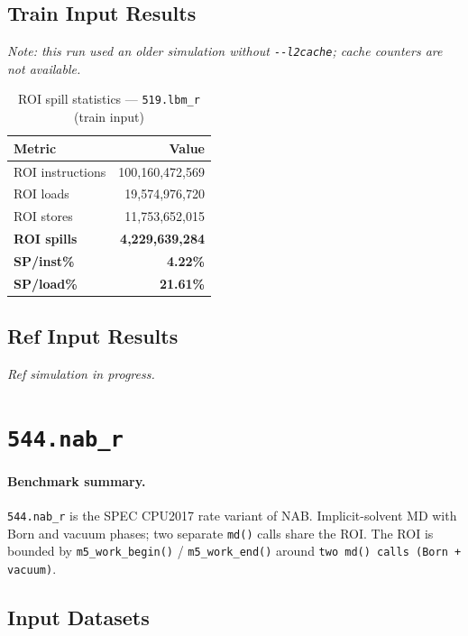 \documentclass[11pt,a4paper]{article}
\begin{document}
\subsection{Train Input Results}

\textit{Note: this run used an older simulation without \texttt{-{}-l2cache}; cache counters are not available.}


\begin{table}[H]
\centering
\caption{ROI spill statistics --- \texttt{519.lbm\_r} (train input)}
\label{tab:lbm_train_roi}
\begin{tabular}{lr}
\toprule
\textbf{Metric} & \textbf{Value} \\
\midrule
ROI instructions & 100,160,472,569 \\
ROI loads        & 19,574,976,720 \\
ROI stores       & 11,753,652,015 \\
\textbf{ROI spills}   & \textbf{4,229,639,284} \\
\textbf{SP/inst\%}   & \textbf{4.22\%} \\
\textbf{SP/load\%}   & \textbf{21.61\%} \\
\bottomrule
\end{tabular}
\end{table}

\subsection{Ref Input Results}
\textit{Ref simulation in progress.}



\section{\texttt{544.nab\_r}}
\label{sec:nab}

\paragraph{Benchmark summary.}
\texttt{544.nab\_r} is the SPEC CPU2017 rate variant of NAB.
Implicit-solvent MD with Born and vacuum phases; two separate \texttt{md()} calls share the ROI.
The ROI is bounded by \texttt{m5\_work\_begin()} / \texttt{m5\_work\_end()}
around \texttt{two md() calls (Born + vacuum)}.

\subsection{Input Datasets}
\end{document}
